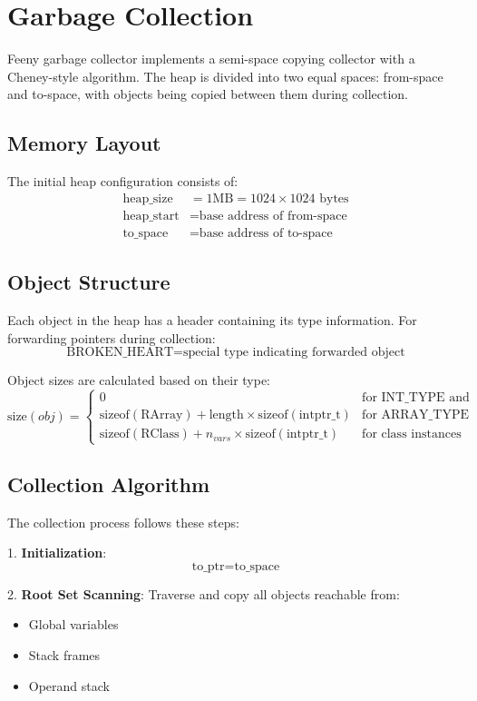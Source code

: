 \documentclass[12pt, a4paper]{article}
\begin{document}
\section{Garbage Collection}


Feeny garbage collector implements a semi-space copying collector with a Cheney-style algorithm. The heap is divided into two equal spaces: from-space and to-space, with objects being copied between them during collection.

\subsection{Memory Layout}
The initial heap configuration consists of:
\[
\begin{aligned}
\text{heap\_size} &= 1\text{MB} = 1024 \times 1024 \text{ bytes} \\
\text{heap\_start} &= \text{base address of from-space} \\
\text{to\_space} &= \text{base address of to-space}
\end{aligned}
\]

\subsection{Object Structure}
Each object in the heap has a header containing its type information. For forwarding pointers during collection:
\[
\text{BROKEN\_HEART} = \text{special type indicating forwarded object}
\]

Object sizes are calculated based on their type:
\[
\text{size}(obj) = \begin{cases}
0 & \text{for INT\_TYPE and NULL\_TYPE} \\
\text{sizeof}(\text{RArray}) + \text{length} \times \text{sizeof}(\text{intptr\_t}) & \text{for ARRAY\_TYPE} \\
\text{sizeof}(\text{RClass}) + n_{vars} \times \text{sizeof}(\text{intptr\_t}) & \text{for class instances}
\end{cases}
\]

\subsection{Collection Algorithm}
The collection process follows these steps:

1. \textbf{Initialization}:
   \[
   \text{to\_ptr} = \text{to\_space}
   \]

2. \textbf{Root Set Scanning}: Traverse and copy all objects reachable from:
   \begin{itemize}
   \item Global variables
   \item Stack frames
   \item Operand stack
   \end{itemize}
\end{document}
